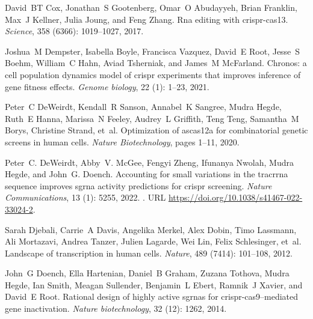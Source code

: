 \documentclass[pdftex,english,10pt]{article}
\begin{document}
{\begin{thebibliography}{105}
David~BT Cox, Jonathan~S Gootenberg, Omar~O Abudayyeh, Brian Franklin, Max~J
  Kellner, Julia Joung, and Feng Zhang.
\newblock Rna editing with crispr-cas13.
\newblock \emph{Science}, 358 (6366): 1019--1027, 2017.

Joshua~M Dempster, Isabella Boyle, Francisca Vazquez, David~E Root, Jesse~S
  Boehm, William~C Hahn, Aviad Tsherniak, and James~M McFarland.
\newblock Chronos: a cell population dynamics model of crispr experiments that
  improves inference of gene fitness effects.
\newblock \emph{Genome biology}, 22 (1): 1--23, 2021.

Peter~C DeWeirdt, Kendall~R Sanson, Annabel~K Sangree, Mudra Hegde, Ruth~E
  Hanna, Marissa~N Feeley, Audrey~L Griffith, Teng Teng, Samantha~M Borys,
  Christine Strand, et~al.
\newblock Optimization of ascas12a for combinatorial genetic screens in human
  cells.
\newblock \emph{Nature Biotechnology}, pages 1--11, 2020.

Peter~C. DeWeirdt, Abby~V. McGee, Fengyi Zheng, Ifunanya Nwolah, Mudra Hegde,
  and John~G. Doench.
\newblock Accounting for small variations in the tracrrna sequence improves
  sgrna activity predictions for crispr screening.
\newblock \emph{Nature Communications}, 13 (1): 5255, 2022.
\newblock {}.
\newblock URL \url{https://doi.org/10.1038/s41467-022-33024-2}.

Sarah Djebali, Carrie~A Davis, Angelika Merkel, Alex Dobin, Timo Lassmann, Ali
  Mortazavi, Andrea Tanzer, Julien Lagarde, Wei Lin, Felix Schlesinger, et~al.
\newblock Landscape of transcription in human cells.
\newblock \emph{Nature}, 489 (7414): 101--108, 2012.

John~G Doench, Ella Hartenian, Daniel~B Graham, Zuzana Tothova, Mudra Hegde,
  Ian Smith, Meagan Sullender, Benjamin~L Ebert, Ramnik~J Xavier, and David~E
  Root.
\newblock Rational design of highly active sgrnas for crispr-cas9--mediated
  gene inactivation.
\newblock \emph{Nature biotechnology}, 32 (12): 1262, 2014.


\end{thebibliography}}
\end{document}
